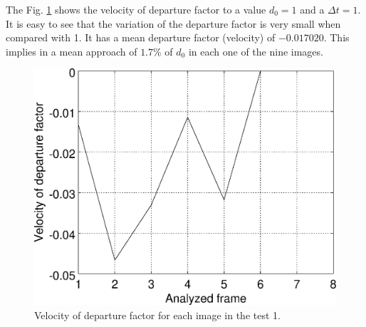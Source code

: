 The Fig. \ref{fig:res_graph1v} shows the velocity of departure factor
to a value $d_0=1$ and a $\Delta t=1$. It is easy to see that the variation
of the departure factor is very small when compared with 1. 
It has a mean departure factor (velocity) of $-0.017020$. This implies in a mean approach of $1.7\%$ of $d_0$
in each one of the nine images.
\begin{figure}[!hbt]
\centering
\includegraphics[width=0.8\columnwidth]{images/graph1v.eps}
\caption{Velocity of departure factor for each image in the test 1.}
\label{fig:res_graph1v}
\end{figure}



